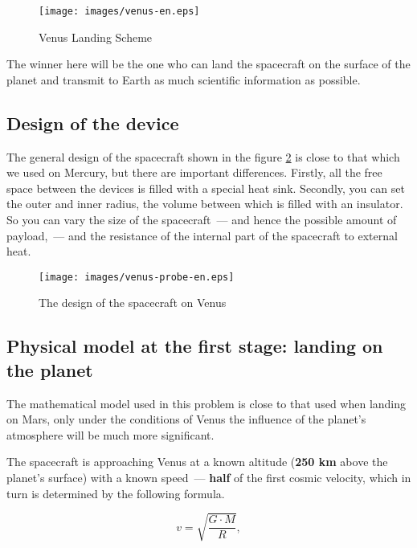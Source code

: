 \documentclass[12pt,a4paper]{article}
\begin{document}
\begin{figure}[tbh]
  \begin{center}
    \texttt{[image: images/venus-en.eps]}
    \caption{Venus Landing Scheme}
    \label{Pic:venus}
  \end{center}
\end{figure}

The winner here will be the one who can land the spacecraft on the surface of the planet and transmit to Earth as much scientific information as possible.

\subsection{Design of the device}

The general design of the spacecraft shown in the figure \ref{Pic:venus-probe} is close to that which we used on Mercury, but there are important differences. Firstly, all the free space between the devices is filled with a special heat sink. Secondly, you can set the outer and inner radius, the volume between which is filled with an insulator. So you can vary the size of the spacecraft~--- and hence the possible amount of payload,~--- and the resistance of the internal part of the spacecraft to external heat.

\begin{figure}[tbh]
  \begin{center}
    \texttt{[image: images/venus-probe-en.eps]}
    \caption{The design of the spacecraft on Venus}
    \label{Pic:venus-probe}
  \end{center}
\end{figure}

\subsection{Physical model at the first stage: landing on the planet}

The mathematical model used in this problem is close to that used when landing on Mars, only under the conditions of Venus the influence of the planet's atmosphere will be much more significant.

The spacecraft is approaching Venus at a known altitude (\textbf{250 km} above the planet's surface) with a known speed~--- \textbf{half} of the first cosmic velocity, which in turn is determined by the following formula.

$$
v = \sqrt{\frac{G \cdot M}{R}},
$$
\end{document}

